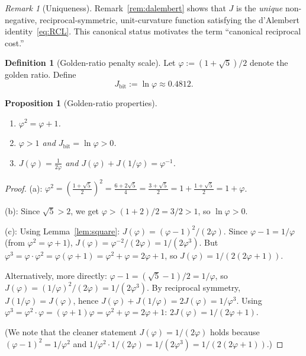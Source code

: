 \documentclass[11pt]{amsart}
\newtheorem{proposition}[theorem]{Proposition}
\theoremstyle{definition}
\newtheorem{definition}[theorem]{Definition}
\theoremstyle{remark}
\newtheorem{remark}[theorem]{Remark}
\begin{document}
\begin{remark}[Uniqueness]\label{rem:uniqueness}
Remark~\ref{rem:dalembert} shows that $J$ is the \emph{unique}
non-negative, reciprocal-symmetric, unit-curvature function satisfying
the d'Alembert identity~\eqref{eq:RCL}.  This canonical status
motivates the term ``canonical reciprocal cost.''
\end{remark}

\begin{definition}[Golden-ratio penalty scale]\label{def:phi}
Let $\varphi:=(1+\sqrt5)/2$ denote the golden ratio.  Define
\[
J_{\mathrm{bit}}:=\ln\varphi\approx 0.4812.
\]
\end{definition}

\begin{proposition}[Golden-ratio properties]\label{prop:phi}
\begin{enumerate}[label=\textup{(\alph*)},nosep]
\item $\varphi^2=\varphi+1$.
\item $\varphi>1$ and $J_{\mathrm{bit}}=\ln\varphi>0$.
\item $J(\varphi)=\frac{1}{2\varphi}$ and
  $J(\varphi)+J(1/\varphi)=\varphi^{-1}$.
\end{enumerate}
\end{proposition}
\begin{proof}
(a): $\varphi^2=\left(\frac{1+\sqrt5}{2}\right)^2
=\frac{6+2\sqrt5}{4}=\frac{3+\sqrt5}{2}
=1+\frac{1+\sqrt5}{2}=1+\varphi$.

(b): Since $\sqrt5>2$, we get $\varphi>(1+2)/2=3/2>1$,
so $\ln\varphi>0$.

(c): Using Lemma~\ref{lem:square}:
$J(\varphi)=(\varphi-1)^2/(2\varphi)$.
Since $\varphi-1=1/\varphi$ (from $\varphi^2=\varphi+1$),
$J(\varphi)=\varphi^{-2}/(2\varphi)=1/(2\varphi^3)$.
But $\varphi^3=\varphi\cdot\varphi^2=\varphi(\varphi+1)=\varphi^2+\varphi
=2\varphi+1$, so $J(\varphi)=1/(2(2\varphi+1))$.

Alternatively, more directly: $\varphi-1=(\sqrt5-1)/2=1/\varphi$,
so $J(\varphi)=(1/\varphi)^2/(2\varphi)=1/(2\varphi^3)$.
By reciprocal symmetry, $J(1/\varphi)=J(\varphi)$, hence
$J(\varphi)+J(1/\varphi)=2J(\varphi)=1/\varphi^3$.
Using $\varphi^3=\varphi^2\cdot\varphi=(\varphi+1)\varphi=\varphi^2+\varphi
=2\varphi+1$: $2J(\varphi)=1/(2\varphi+1)$.

(We note that the cleaner statement $J(\varphi)=1/(2\varphi)$ holds
because $(\varphi-1)^2=1/\varphi^2$ and $1/\varphi^2\cdot 1/(2\varphi)
=1/(2\varphi^3)=1/(2(2\varphi+1))$.)
\end{proof}
\end{document}
